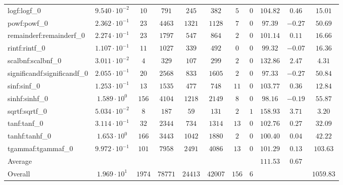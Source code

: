 \begin{tabular}{|l|c|c|c|c|c|c|c|c|c|c|}
logf:logf\_0                 & $ 9.540 \cdot 10^{-2} $ & $ 10     $ & $ 791   $ & $ 245   $ & $ 382   $ & $ 5   $ & $ 0 $ & $ 104.82      $ & $ 0.46    $ & $ 15.01   $ \\
powf:powf\_0                 & $ 2.362 \cdot 10^{-1} $ & $ 23     $ & $ 4463  $ & $ 1321  $ & $ 1128  $ & $ 7   $ & $ 0 $ & $ 97.39       $ & $ -0.27   $ & $ 50.69   $ \\
remainderf:remainderf\_0     & $ 2.274 \cdot 10^{-1} $ & $ 23     $ & $ 1797  $ & $ 547   $ & $ 864   $ & $ 2   $ & $ 0 $ & $ 101.14      $ & $ 0.11    $ & $ 16.66   $ \\
rintf:rintf\_0               & $ 1.107 \cdot 10^{-1} $ & $ 11     $ & $ 1027  $ & $ 339   $ & $ 492   $ & $ 0   $ & $ 0 $ & $ 99.32       $ & $ -0.07   $ & $ 16.36   $ \\
scalbnf:scalbnf\_0           & $ 3.011 \cdot 10^{-2} $ & $ 4      $ & $ 329   $ & $ 107   $ & $ 299   $ & $ 2   $ & $ 0 $ & $ 132.86      $ & $ 2.47    $ & $ 4.31    $ \\
significandf:significandf\_0 & $ 2.055 \cdot 10^{-1} $ & $ 20     $ & $ 2568  $ & $ 833   $ & $ 1605  $ & $ 2   $ & $ 0 $ & $ 97.33       $ & $ -0.27   $ & $ 50.84   $ \\
sinf:sinf\_0                 & $ 1.253 \cdot 10^{-1} $ & $ 13     $ & $ 1535  $ & $ 477   $ & $ 748   $ & $ 11  $ & $ 0 $ & $ 103.77      $ & $ 0.36    $ & $ 12.84   $ \\
sinhf:sinhf\_0               & $ 1.589 \cdot 10^{0}  $ & $ 156    $ & $ 4104  $ & $ 1218  $ & $ 2149  $ & $ 8   $ & $ 0 $ & $ 98.16       $ & $ -0.19   $ & $ 55.87   $ \\
sqrtf:sqrtf\_0               & $ 5.034 \cdot 10^{-2} $ & $ 8      $ & $ 187   $ & $ 59    $ & $ 131   $ & $ 2   $ & $ 1 $ & $ 158.93      $ & $ 3.71    $ & $ 3.20    $ \\
tanf:tanf\_0                 & $ 3.114 \cdot 10^{-1} $ & $ 32     $ & $ 2344  $ & $ 734   $ & $ 1314  $ & $ 13  $ & $ 0 $ & $ 102.76      $ & $ 0.27    $ & $ 32.09   $ \\
tanhf:tanhf\_0               & $ 1.653 \cdot 10^{0}  $ & $ 166    $ & $ 3443  $ & $ 1042  $ & $ 1880  $ & $ 2   $ & $ 0 $ & $ 100.40      $ & $ 0.04    $ & $ 42.22   $ \\
tgammaf:tgammaf\_0           & $ 9.972 \cdot 10^{-1} $ & $ 101    $ & $ 7958  $ & $ 2491  $ & $ 4086  $ & $ 13  $ & $ 0 $ & $ 101.29      $ & $ 0.13    $ & $ 103.63  $ \\
\hline
Average                      & $                     $ & $        $ & $       $ & $       $ & $       $ & $     $ & $   $ & $ 111.53      $ & $ 0.67    $ & $         $ \\
\hline
Overall                      & $ 1.969 \cdot 10^{1}  $ & $ 1974   $ & $ 78771 $ & $ 24413 $ & $ 42007 $ & $ 156 $ & $ 6 $ & $             $ & $         $ & $ 1059.83 $ \\
\hline
\end{tabular}
